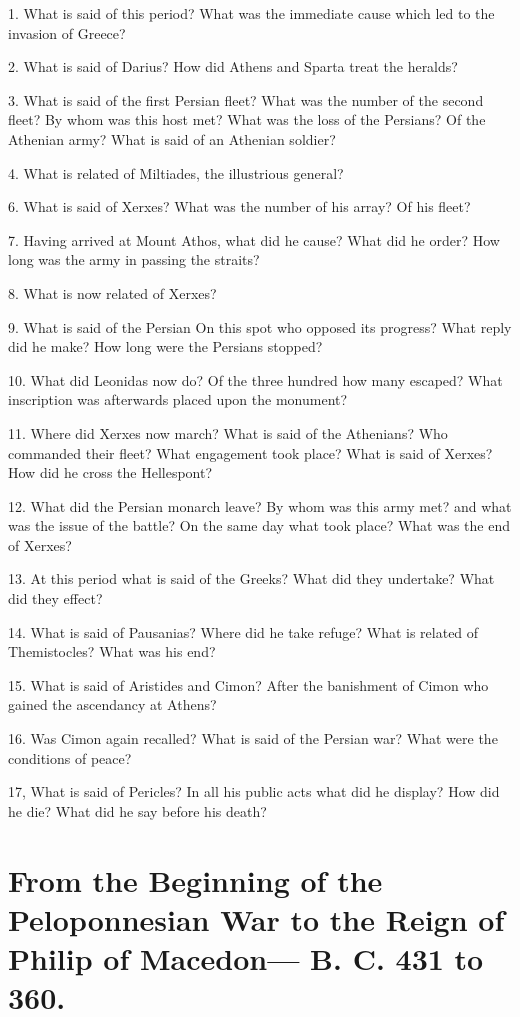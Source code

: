\documentclass[openany,a4paper]{memoir}
\begin{document}
1. What is said of this period? What was the immediate cause which led to the invasion of Greece? 

2. What is said of 
Darius? 
How did Athens and Sparta treat the heralds? 

3. What is said of 
the first Persian fleet? What was the number of the second fleet? By 
whom was this host met? What was the loss of the Persians? Of the 
Athenian army? What is said of an Athenian soldier? 

4. What is 
related of Miltiades, the illustrious general? 

6. What is said of Xerxes? What was the number of his array? Of 
his fleet?

7. Having arrived at Mount Athos, what did he cause?
What did he order? How long was the army in passing the straits? 

8. What is now related of Xerxes? 

9. What is said of the Persian 
On this spot who opposed its progress? What reply did he make? 
How long were the Persians stopped?

10. What did Leonidas now 
do? Of the three hundred how many escaped? What inscription was 
afterwards placed upon the monument? 

11. Where did Xerxes now 
march? What is said of the Athenians? 
Who commanded their fleet? What engagement took place? What is 
said of Xerxes? How did he cross the Hellespont? 

12. What did the 
Persian monarch leave? By whom was this army met? and what was 
the issue of the battle? On the same day what took place? What was 
the end of Xerxes? 

13. At this period what is said of the Greeks? 
What did they undertake? What did they effect? 

14. What is said of Pausanias? Where did he take refuge? 
What is related of Themistocles? What was his end? 

15. What is 
said of Aristides and Cimon? After the banishment of Cimon who 
gained the ascendancy at Athens? 

16. Was Cimon again recalled? 
What is said of the Persian war? What were the conditions of peace? 

17, What is said of Pericles? In all his public acts what did he 
display? How did he die? What did he say before his death? 



\chapter{From the Beginning of the Peloponnesian War to 
the Reign of Philip of Macedon--- B. C. 431 to 360.} 
\end{document}
